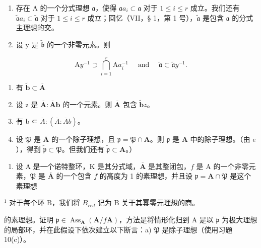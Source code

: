 \begin{enumerate}
\def\labelenumi{\alph{enumi})}
\item
  存在 A 的一个分式理想 \(\mathfrak{a}\)，使得 \(\mathfrak{a}a_{i} \subset \mathfrak{a}\) 对于 \(1 \leqslant i \leqslant r\) 成立。我们还有 \(\tilde{\mathfrak{a}}a_{i} \subset \tilde{\mathfrak{a}}\) 对于 \(1 \leqslant i \leqslant r\) 成立；回忆（VII，§ 1，第 1 号），\(\tilde{\mathfrak{a}}\) 是包含 \(\mathfrak{a}\) 的分式主理想的交。
\item
  设 y 是 \(\tilde{\mathfrak{b}}\) 的一个非零元素。则
\end{enumerate}

\[
\mathrm{A} y ^ {- 1} \supset \bigcap_ {i = 1} ^ {r} \mathrm{A} a _ {i} ^ {- 1} \quad \text { and } \quad \widetilde {\mathfrak {a}} \subset \widetilde {\mathfrak {a}} y ^ {- 1}.
\]

\begin{enumerate}
\def\labelenumi{\alph{enumi})}
\setcounter{enumi}{2}
\item
  有 \(\tilde{\mathbf{b}}\subset \overline{\mathbf{A}}\)
\item
  设 z 是 \(\overline{\mathbf{A}}:\overline{\mathbf{A}}\mathbf{b}\) 的一个元素。则 \(\overline{\mathbf{A}}\) 包含 \(\tilde{\mathbf{b}}z\)。
\item
  有 b ⊂ \(\overline{A}:(\overline{A}:\overline{A}b)\)。
\item
  设 \(\mathfrak{P}\) 是 \(\overline{\mathbf{A}}\) 的一个除子理想，且 \(\mathfrak{p} = \mathfrak{P} \cap \mathbf{A}\)。则 \(\mathfrak{p}\) 是 \(\mathbf{A}\) 中的除子理想。（由 \(e\)），得到 \(\tilde{\mathfrak{p}} \subset \mathfrak{P}\)。但我们还有 \(\tilde{\mathfrak{p}} \subset \mathbf{A}\)。）
\end{enumerate}

\begin{enumerate}
\def\labelenumi{\arabic{enumi})}
\setcounter{enumi}{12}
\tightlist
\item
  设 A 是一个诺特整环，K 是其分式域，\(\overline{\mathbf{A}}\) 是其整闭包，\(f\) 是 A 的一个非零元素，\(\mathfrak{P}\) 是 \(\overline{\mathbf{A}}\) 的一个包含 \(f\) 的高度为 1 的素理想，并且设 \(\mathfrak{p} = \mathbf{A} \cap \mathfrak{P}\) 是这个素理想
\end{enumerate}

\(^{1}\) 对于每个环 B，我们将 \(B_{red}\) 记为 B 关于其幂零元理想的商。

的素理想。证明 \(\mathfrak{p} \in \operatorname{Ass}_{\mathbf{A}}(\mathbf{A}/f\mathbf{A})\)，方法是将情形化归到 A 是以 \(\mathfrak{p}\) 为极大理想的局部环，并在此假设下依次建立以下断言：a) \(\mathfrak{P}\) 是除子理想（使用习题 10(c)）。

